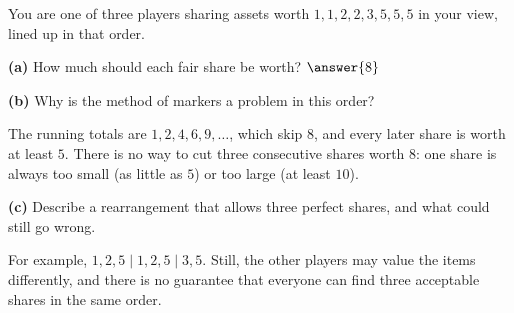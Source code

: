 \documentclass[12pt]{ximera}
\begin{document}
\begin{problem}
You are one of three players sharing assets worth $1,1,2,2,3,5,5,5$ in your view, lined
up in that order.

\begin{prompt}
\textbf{(a)} How much should each fair share be worth? $\answer{8}$
\end{prompt}

\begin{prompt}
\textbf{(b)} Why is the method of markers a problem in this order?
\begin{freeResponse}
\end{freeResponse}
\begin{feedback}
The running totals are $1,2,4,6,9,\ldots$, which skip $8$, and every later share is worth
at least $5$. There is no way to cut three consecutive shares worth $8$: one share is
always too small (as little as $5$) or too large (at least $10$).
\end{feedback}
\end{prompt}

\begin{prompt}
\textbf{(c)} Describe a rearrangement that allows three perfect shares, and what could
still go wrong.
\begin{freeResponse}
\end{freeResponse}
\begin{feedback}
For example, $1,2,5\mid1,2,5\mid3,5$. Still, the other players may value the items
differently, and there is no guarantee that everyone can find three acceptable shares in
the same order.
\end{feedback}
\end{prompt}
\end{problem}
\end{document}
